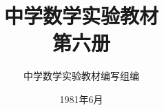 \documentclass[b5paper, openany]{ctexbook}
\theoremstyle{plain}
\begin{document}














\title{中学数学实验教材\\第六册}



\author{中学数学实验教材编写组编}
\date{1981年6月}

\maketitle




\frontmatter

%
\tableofcontents


\mainmatter



 


\end{document}
